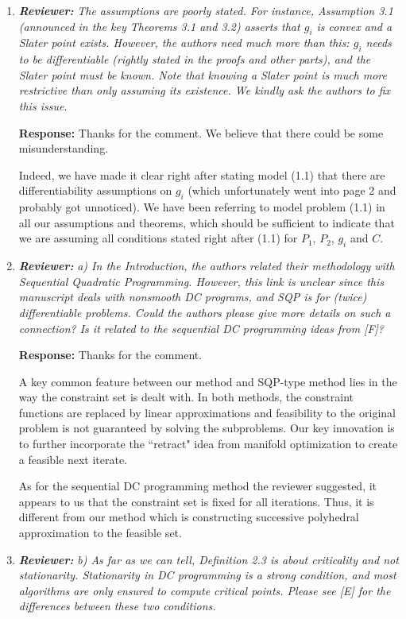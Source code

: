 \documentclass{article}
\begin{document}
\begin{enumerate}
    \item \textit{\textbf{Reviewer:}} {\it The assumptions are poorly stated. For instance, Assumption 3.1 (announced in the key Theorems 3.1 and 3.2) asserts that $g_i$ is convex and a Slater point exists. However, the authors need much more than this: $g_i$ needs to be differentiable (rightly stated in the proofs and other parts), and the Slater point must be known. Note that knowing a Slater point is much more restrictive than only assuming its existence. We kindly ask the authors to fix this issue.}
        
    \textbf{Response:} Thanks for the comment. We believe that there could be some misunderstanding.
    
    Indeed, we have made it clear right after stating model (1.1) that there are differentiability assumptions on $g_i$ (which unfortunately went into page 2 and probably got unnoticed). We have been referring to model problem (1.1) in all our assumptions and theorems, which should be sufficient to indicate that we are assuming all conditions stated right after (1.1) for $P_1$, $P_2$, $g_i$ and $C$.

	\item \textit{\textbf{Reviewer:}} \textit{ a) In the Introduction, the authors related their methodology with Sequential Quadratic Programming. However, this link is unclear since this manuscript deals with nonsmooth DC programs, and SQP is for (twice) differentiable problems. Could the authors please give more details on such a connection? Is it related to the sequential DC programming ideas from [F]?}
	
	\textbf{Response:} Thanks for the comment.

    A key common feature between our method and SQP-type method lies in the way the constraint set is dealt with. In both methods, the constraint functions are replaced by linear approximations and feasibility to the original problem is not guaranteed by solving the subproblems. Our key innovation is to further incorporate the ``retract" idea from manifold optimization to create a feasible next iterate.
    
    As for the sequential DC programming method the reviewer suggested, it appears to us that the constraint set is fixed for all iterations. Thus, it is different from our method which is constructing successive polyhedral approximation to the feasible set.
	
	\item \textit{\textbf{Reviewer:}} \textit{ b) As far as we can tell, Definition 2.3 is about criticality and not stationarity. Stationarity in DC programming is a strong condition, and most algorithms are only ensured to compute critical points. Please see [E] for the differences between these two conditions.}
	

\end{enumerate}
\end{document}
